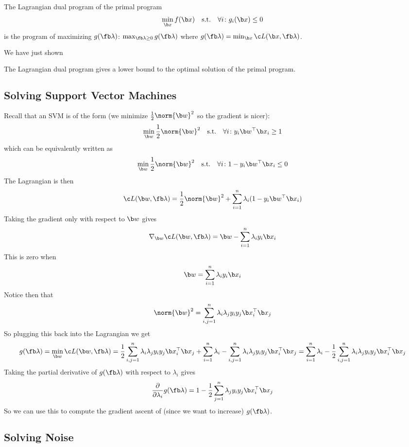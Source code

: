 \bdefn

    The {\emphcolor Lagrangian dual program} of the primal program
    $$ \min_{\b x}f(\b x) \hbox{\quad s.t.\quad} \forall i\colon g_i(\b x)\leq 0 $$
    is the program of maximizing $g(\fb\lambda)$: $\max_{\fb\lambda\geq0}g(\fb\lambda)$ where $g(\fb\lambda)=\min_{\b x}\c L(\b x,\fb\lambda)$.

\edefn

\noindent We have just shown

\bthrm[title=Weak Duality Principle]

    The Lagrangian dual program gives a lower bound to the optimal solution of the primal program.

\ethrm

\subsection{Solving Support Vector Machines}

Recall that an SVM is of the form (we minimize $\frac12\norm{\b w}^2$ so the gradient is nicer):
$$ \min_{\b w}\frac12\norm{\b w}^2 \hbox{\quad s.t.\quad} \forall i\colon y_i\b w^\top\b x_i \geq 1 $$
which can be equivalently written as
$$ \min_{\b w}\frac12\norm{\b w}^2 \hbox{\quad s.t.\quad} \forall i\colon 1-y_i\b w^\top\b x_i \leq 0 $$
The Lagrangian is then
$$ \c L(\b w,\fb\lambda) = \frac12\norm{\b w}^2 + \sum_{i=1}^n\lambda_i(1-y_i\b w^\top\b x_i) $$
Taking the gradient only with respect to $\b w$ gives
$$ \nabla_{\b w}\c L(\b w,\fb\lambda) = \b w - \sum_{i=1}^n\lambda_i y_i\b x_i $$
This is zero when
$$ \b w = \sum_{i=1}^n\lambda_iy_i\b x_i $$
Notice then that
$$ \norm{\b w}^2 = \sum_{i,j=1}^n\lambda_i\lambda_jy_iy_j\b x_i^\top\b x_j $$
So plugging this back into the Lagrangian we get
$$ g(\fb\lambda) = \min_{\b w}\c L(\b w,\fb\lambda) = \frac12\sum_{i,j=1}^n\lambda_i\lambda_jy_iy_j\b x_i^\top\b x_j + \sum_{i=1}^n\lambda_i - \sum_{i,j=1}^n\lambda_i\lambda_jy_iy_j\b x_i^\top\b x_j =
\sum_{i=1}^n\lambda_i - \frac12\sum_{i,j=1}^n\lambda_i\lambda_jy_iy_j\b x_i^\top\b x_j $$
Taking the partial derivative of $g(\fb\lambda)$ with respect to $\lambda_i$ gives
$$ \frac\partial{\partial\lambda_i}g(\fb\lambda) = 1 - \frac12\sum_{j=1}^n\lambda_jy_iy_j\b x_i^\top\b x_j $$
So we can use this to compute the gradient ascent of (since we want to increase) $g(\fb\lambda)$.

\subsection{Solving Noise}


